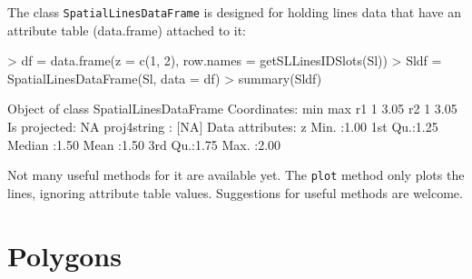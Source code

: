 \documentclass{article}
\begin{document}
The class {\tt SpatialLinesDataFrame} is designed for holding
lines data that have an attribute table (data.frame) attached
to it:
\begin{Schunk}
\begin{Sinput}
> df = data.frame(z = c(1, 2), row.names = getSLLinesIDSlots(Sl))
> Sldf = SpatialLinesDataFrame(Sl, data = df)
> summary(Sldf)
\end{Sinput}
\begin{Soutput}
Object of class SpatialLinesDataFrame
Coordinates:
   min  max
r1   1 3.05
r2   1 3.05
Is projected: NA 
proj4string : [NA]
Data attributes:
       z       
 Min.   :1.00  
 1st Qu.:1.25  
 Median :1.50  
 Mean   :1.50  
 3rd Qu.:1.75  
 Max.   :2.00  
\end{Soutput}
\end{Schunk}
Not many useful methods for it are available yet.  The {\tt plot} method
only plots the lines, ignoring attribute table values. Suggestions for
useful methods are welcome.

\section{Polygons}
\end{document}
